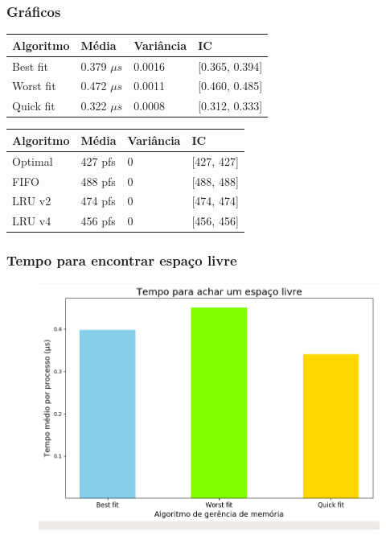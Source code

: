 \documentclass{beamer}
\begin{document}
\begin{frame}
\frametitle{Gráficos}
\begin{table}
\begin{tabular}{l l l l}
\toprule
\textbf{Algoritmo} & \textbf{Média} & \textbf{Variância} & \textbf{IC}\\
\midrule
Best fit   & 0.379 $\mu s$ & 0.0016 & [0.365, 0.394] \\
Worst fit  & 0.472 $\mu s$ & 0.0011 & [0.460, 0.485] \\
Quick fit  & 0.322 $\mu s$ & 0.0008 & [0.312, 0.333] \\
\bottomrule
\end{tabular}
\end{table}

\begin{table}
\begin{tabular}{l l l l}
\toprule
\textbf{Algoritmo} & \textbf{Média} & \textbf{Variância} & \textbf{IC}\\
\midrule
Optimal & 427 pfs & 0 & [427, 427] \\
FIFO    & 488 pfs & 0 & [488, 488] \\
LRU v2  & 474 pfs & 0 & [474, 474] \\
LRU v4  & 456 pfs & 0 & [456, 456] \\
\bottomrule
\end{tabular}
\end{table}
\end{frame}


\begin{frame}
\frametitle{Tempo para encontrar espaço livre}
\begin{figure}
\includegraphics[scale=0.3]{alloc_time.png}
\end{figure}
\end{frame}
\end{document}
